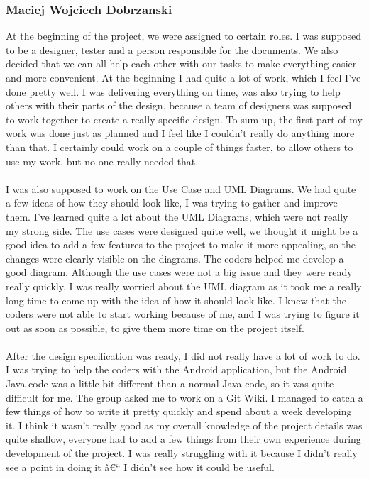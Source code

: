 \documentclass[12pt]{article}
\begin{document}
\subsubsection{Maciej Wojciech Dobrzanski}
At the beginning of the project, we were assigned to certain roles. I was supposed to be a designer, tester and a person responsible for the documents. We also decided that we can all help each other with our tasks to make everything easier and more convenient. At the beginning I had quite a lot of work, which I feel I've done pretty well. I was delivering everything on time, was also trying to help others with their parts of the design, because a team of designers was supposed to work together to create a really specific design. To sum up, the first part of my work was done just as planned and I feel like I couldn't really do anything more than that. I certainly could work on a couple of things faster, to allow others to use my work, but no one really needed that. 
~\\\\
 I was also supposed to work on the Use Case and UML Diagrams. We had quite a few ideas of how they should look like, I was trying to gather and improve them. I've learned quite a lot about the UML Diagrams, which were not really my strong side. The use cases were designed quite well, we thought it might be a good idea to add a few features to the project to make it more appealing, so the changes were clearly visible on the diagrams. The coders helped me develop a good diagram. Although the use cases were not a big issue and they were ready really quickly, I was really worried about the UML diagram as it took me a really long time to come up with the idea of how it should look like. I knew that the coders were not able to start working because of me, and I was trying to figure it out as soon as possible, to give them more time on the project itself. 
~\\\\
After the design specification was ready, I did not really have a lot of work to do. I was trying to help the coders with the Android application, but the Android Java code was a little bit different than a normal Java code, so it was quite difficult for me. The group asked me to work on a Git Wiki. I managed to catch a few things of how to write it pretty quickly and spend about a week developing it. I think it wasn't really good as my overall knowledge of the project details was quite shallow, everyone had to add a few things from their own experience during development of the project. I was really struggling with it because I didn't really see a point in doing it â€“ I didn't see how it could be useful.
\end{document}
